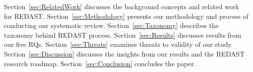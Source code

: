 Section~\ref{sec:RelatedWork} discusses the background concepts and related work for REDAST.
Section~\ref{sec:Methodology} presents our methodology and process of conducting our systematic review.
Section~\ref{sec:Taxonomy} describes the taxonomy behind REDAST process.
Section~\ref{sec:Results} discusses results from our five RQs.
Section~\ref{sec:Threats} examines threats to validity of our study.
Section~\ref{sec:Discussion} discusses the insights from our results and the REDAST research roadmap.
Section~\ref{sec:Conclusion} concludes the paper.